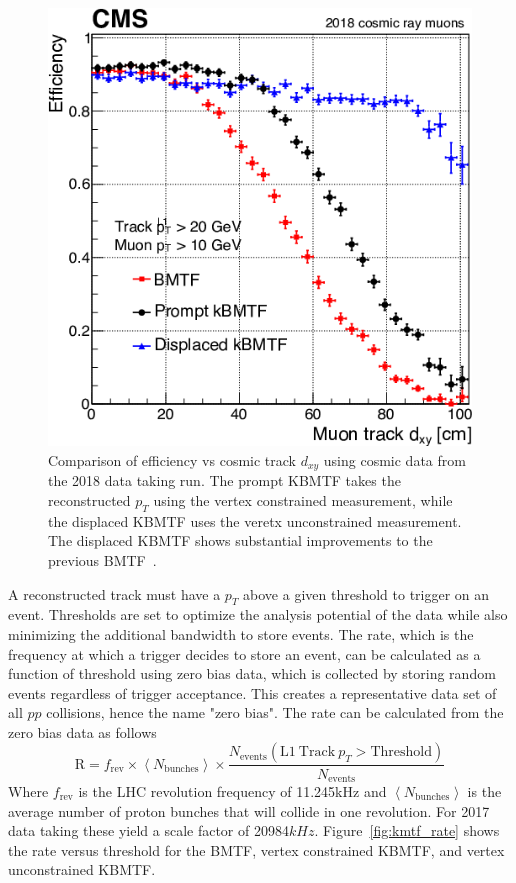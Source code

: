 \begin{figure}[htbp!]
	\centering
	\includegraphics[width=0.5\linewidth]{figs/04_muons/effVsDxy_kmtf.png}
	\caption[Comparison of efficiency vs cosmic track $d_{xy}$ using cosmic data from the 2018 data taking run. The prompt KBMTF takes the reconstructed $p_{T}$ using the vertex constrained measurement, while the displaced KBMTF uses the veretx unconstrained measurement. The displaced KBMTF shows substantial improvements to the previous BMTF~\cite{Hayrapetyan:2870088}]
	{Comparison of efficiency vs cosmic track $d_{xy}$ using cosmic data from the 2018 data taking run. The prompt KBMTF takes the reconstructed $p_{T}$ using the vertex constrained measurement, while the displaced KBMTF uses the veretx unconstrained measurement. The displaced KBMTF shows substantial improvements to the previous BMTF~\cite{Hayrapetyan:2870088}.}
	\label{fig:effVsDxy_kmtf}
\end{figure}

A reconstructed track must have a $p_T$ above a given threshold to trigger on an event. Thresholds are set to optimize the analysis potential of the data while also minimizing the additional bandwidth to store events. The rate, which is the frequency at which a trigger decides to store an event, can be calculated as a function of threshold using zero bias data, which is collected by storing random events regardless of trigger acceptance. This creates a representative data set of all $pp$ collisions, hence the name "zero bias". The rate can be calculated from the zero bias data as follows
\begin{equation}
	\mathrm{R} = f_\mathrm{rev}\times \left<N_\mathrm{bunches}\right>\times\frac{N_\mathrm{events}(\mathrm{L1}\ \mathrm{Track}\ p_{T}>\mathrm{Threshold})}{N_\mathrm{events}}
\end{equation}
Where $f_\mathrm{rev}$ is the LHC revolution frequency of 11.245\unit{kHz} and $\left<N_\mathrm{bunches}\right>$ is the average number of proton bunches that will collide in one revolution. For 2017 data taking these yield a scale factor of 20984$\unit{kHz}$. Figure~\ref{fig:kmtf_rate} shows the rate versus threshold for the BMTF, vertex constrained KBMTF, and vertex unconstrained KBMTF.

